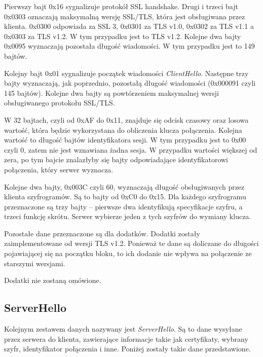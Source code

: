 \documentclass[12pt,twoside,a4]{mwbk}
\theoremstyle{definition}
\begin{document}
Pierwszy bajt 0x16 sygnalizuje protokół SSL handshake. Drugi i trzeci bajt 0x0303 oznaczają maksymalną wersję SSL/TLS, która jest obsługiwana przez klienta. 0x0300 odpowiada za SSL 3, 0x0301 za TLS v1.0, 0x0302 za TLS v1.1 a 0x0303 za TLS v1.2. W tym przypadku jest to TLS v1.2. Kolejne dwa bajty 0x0095 wyznaczają pozostała długość wiadomości. W tym przypadku jest to  149 bajtów. \\ \par

Kolejny bajt 0x01 sygnalizuje początek wiadomości \textit{ClientHello}. Następne trzy bajty wyznaczają, jak poprzednio, pozostałą długość wiadomości (0x000091 czyli 145 bajtów). Kolejne dwa bajty są powtórzeniem maksymalnej wersji obsługiwanego protokołu SSL/TLS. \\ \par

W 32 bajtach, czyli od 0xAF do 0x11, znajduje się odcisk czasowy oraz losowa wartość, która będzie wykorzystana do obliczenia klucza połączenia. Kolejna wartość to długość bajtów identyfikatora sesji. W tym przypadku jest to 0x00 czyli 0, zatem nie jest wznawiana żadna sesja. W przypadku wartości większej od zera, po tym bajcie znalazłyby się bajty odpowiadające identyfikatorowi połączenia, który serwer wyznacza. \\ \par

Kolejne dwa bajty, 0x003C czyli 60, wyznaczają długość obsługiwanych przez klienta szyfrogramów. Są to bajty od 0xC0 do 0x15. Dla każdego szyfrogramu przeznaczone są trzy bajty -- pierwsze dwa identyfikują specyfikacje szyfru, a trzeci funkcję skrótu. Serwer wybierze jeden z tych szyfrów do wymiany klucza. \\ \par

Pozostałe dane przeznaczone są dla dodatków. Dodatki zostały zaimplementowane od wersji TLS v1.2. Ponieważ te dane są doliczane do długości pojawiającej się na początku bloku, to ich dodanie nie wpływa na połączenie ze starszymi wersjami. \\ \par
Dodatki nie zostaną omówione.


\subsection{ServerHello}
Kolejnym zestawem danych nazywany jest \textit{ServerHello}. Są to dane wysyłane przez serwera do klienta, zawierające informacje takie jak certyfikaty, wybrany szyfr, identyfikator połączenia i inne. Poniżej zostały takie dane przedstawione.
\end{document}
